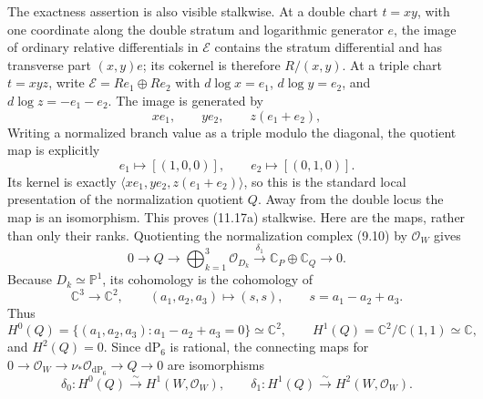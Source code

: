 \begin{remark}
The exactness assertion is also visible stalkwise.  At a double chart $t=xy$, with one
coordinate along the double stratum and logarithmic generator $e$, the image
of ordinary relative differentials in $\mathcal E$ contains the stratum
differential and has transverse part $(x,y)e$; its cokernel is therefore
$R/(x,y)$.  At a triple chart $t=xyz$, write
$\mathcal E=Re_1\oplus Re_2$ with
$d\log x=e_1$, $d\log y=e_2$, and
$d\log z=-e_1-e_2$.  The image is generated by
\[
 xe_1,\qquad ye_2,\qquad z(e_1+e_2),
\]
Writing a normalized branch value as a triple modulo the diagonal, the
quotient map is explicitly
\[
 e_1\longmapsto[(1,0,0)],\qquad
 e_2\longmapsto[(0,1,0)].
\tag{11.17a$''$}
\]
Its kernel is exactly
$\langle xe_1,ye_2,z(e_1+e_2)\rangle$, so this is the standard local
presentation of the normalization quotient $Q$.
Away from the double locus the map is an isomorphism.  This proves (11.17a)
stalkwise.
Here are the maps, rather than only their ranks.  Quotienting the normalization
complex (9.10) by $\mathcal O_W$ gives
\[
 0\longrightarrow Q\longrightarrow
 \bigoplus_{k=1}^3\mathcal O_{D_k}
 \xrightarrow{\delta_1}\mathbb C_P\oplus\mathbb C_Q
 \longrightarrow0.
\]
Because $D_k\simeq\mathbb P^1$, its cohomology is the cohomology of
\[
 \mathbb C^3\longrightarrow\mathbb C^2,\qquad
 (a_1,a_2,a_3)\longmapsto(s,s),\qquad s=a_1-a_2+a_3.
\]
Thus
\[
 H^0(Q)=\{(a_1,a_2,a_3):a_1-a_2+a_3=0\}\simeq\mathbb C^2,
 \qquad H^1(Q)=\mathbb C^2/\mathbb C(1,1)\simeq\mathbb C,
\tag{11.17b}
\]
and $H^2(Q)=0$.  Since $\mathrm{dP}_6$ is rational, the connecting maps for
$0\to\mathcal O_W\to\nu_*\mathcal O_{\mathrm{dP}_6}\to Q\to0$ are
isomorphisms
\[
 \delta_0:H^0(Q)\xrightarrow{\sim}H^1(W,\mathcal O_W),
 \qquad
 \delta_1:H^1(Q)\xrightarrow{\sim}H^2(W,\mathcal O_W).
\tag{11.17c}
\]


\end{remark}
